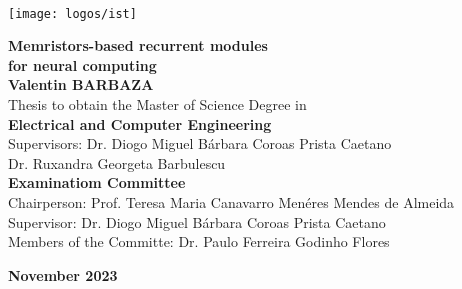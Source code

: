 \newcommand\blurredimage[3]{
  \node[opacity=0.2] at (#1) {\texttt{[image: \#3]}};
  \node[opacity=0.2] at (#1+ #2, #2) {\texttt{[image: \#3]}};
  \node[opacity=0.2] at (#1+-#2, #2) {\texttt{[image: \#3]}};
  \node[opacity=0.2] at (#1+-#2,-#2) {\texttt{[image: \#3]}};
  \node[opacity=0.2] at (#1+ #2,-#2) {\texttt{[image: \#3]}};
  }

  \setcounter{page}{1} 


  \thispagestyle{empty}

  \begin{flushleft}
    ~\\ \vspace{-12mm} \hspace{-12mm}
    \texttt{[image: logos/ist]}
    \\ \begin{center}
    \end{center} %

    \vspace{5mm}
    \centering
    \LARGE \textbf{Memristors-based recurrent modules\\for neural computing}
    \\ \vspace{15mm}
    \Large \textbf{Valentin BARBAZA} \\
    \vspace{12mm}
    \large Thesis to obtain the Master of Science Degree in
    \\ \vspace{2mm}
    \LARGE \textbf{Electrical and Computer Engineering}
    \\ \vspace{10mm}
    \large Supervisors: Dr. Diogo Miguel B\'{a}rbara Coroas Prista Caetano\\
    \large  Dr. Ruxandra Georgeta Barbulescu
    \\ \vspace{15mm}
    \Large \textbf{Examinatiom Committee}
    \\ \vspace{5mm}
    \large Chairperson: Prof. Teresa Maria Canavarro Men\'{e}res Mendes de Almeida\\
    \large Supervisor: Dr. Diogo Miguel B\'{a}rbara Coroas Prista Caetano\\
    \large Members of the Committe: Dr. Paulo Ferreira Godinho Flores

    \vspace{10mm}

    \Large \textbf{November 2023} \\
    \let\thepage\relax
  \end{flushleft}
  \pagebreak


